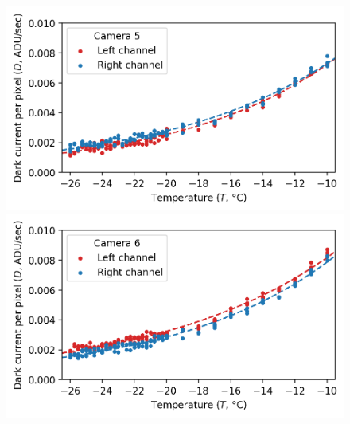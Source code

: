 \begin{colsection}
\begin{colsection}
\begin{figure}[p]
\begin{center}
        \begin{minipage}[t]{0.49\textwidth}\vspace{10pt}
            \includegraphics[width=\linewidth]{images/detectors/dc_5.png}
        \end{minipage}
        \begin{minipage}[t]{0.49\textwidth}\vspace{10pt}
            \includegraphics[width=\linewidth]{images/detectors/dc_6.png}
        \end{minipage}


\end{center}
\end{figure}
\end{colsection}
\end{colsection}
